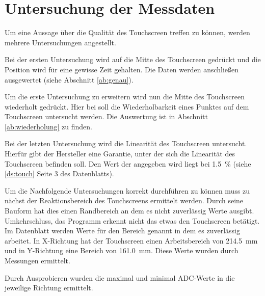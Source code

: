 \chapter{Untersuchung der Messdaten}
Um eine Aussage über die Qualität des Touchscreen treffen zu können, werden mehrere Untersuchungen angestellt.

Bei der ersten Untersuchung wird auf die Mitte des Touchscreen gedrückt und die Position wird für eine gewisse Zeit gehalten.
Die Daten werden anschließen ausgewertet (siehe Abschnitt \cref{ab:genau}).

Um die erste Untersuchung zu erweitern wird nun die Mitte des Touchscreen wiederholt gedrückt.
Hier bei soll die Wiederholbarkeit eines Punktes auf dem Touchscreen untersucht werden.
Die Auswertung ist in Abschnitt \cref{ab:wiederholung} zu finden.

Bei der letzten Untersuchung wird die Linearität des Touchscreen untersucht.
Hierfür gibt der Hersteller eine Garantie, unter der sich die Linearität des Touchscreen befinden soll.
Den Wert der angegeben wird liegt bei \SI{1,5}{\%} (siehe \cref{ds:touch} Seite 3 des Datenblatts).

Um die Nachfolgende Untersuchungen korrekt durchführen zu können muss zu nächst der Reaktionsbereich des Touchscreens ermittelt werden.
Durch seine Bauform hat dies einen Randbereich an dem es nicht zuverlässig Werte ausgibt.
Umkehrschluss, das Programm erkennt nicht das etwas den Touchscreen betätigt.
Im Datenblatt werden Werte für den Bereich genannt in dem es zuverlässig arbeitet.
In X-Richtung hat der Touchscreen einen Arbeitsbereich von \SI{214,5}{mm} und in Y-Richtung eine Bereich von \SI{161,0}{mm}.
Diese Werte wurden durch Messungen ermittelt.

Durch Ausprobieren wurden die maximal und minimal ADC-Werte in die jeweilige Richtung ermittelt.

